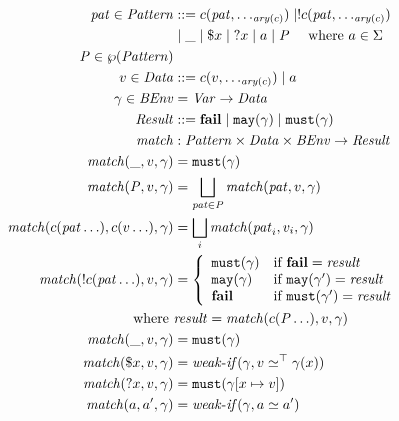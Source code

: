 \documentclass[preprint,onecolumn,9pt]{sigplanconf} %
\begin{document}
\begin{figure}
  \begin{align*}
    \mpat \in \Pattern &::= \mconstructor(\mpat, \ldots_{\ary(\mconstructor)}) \alt \snonevent{\mconstructor(\mpat, \ldots_{\ary(\mconstructor)})} \\
     & \alt \swc \alt \sref{\mvar} \alt \sbind{\mvar} \alt \matom \alt \mpatset
      \quad\text{ where } \matom \in \Sigma
\\
    \mpatset \in \wp(\Pattern)
\\
    \mdata \in \Qualified &::= \mconstructor(\mdata, \ldots_{\ary(\mconstructor)}) \alt \matom
\\
    \mbindenv \in \BindEnv &= \Var \to \Qualified
\\
    \MatchResult &::= \mfail \alt \smay{\mbindenv} \alt \smust{\mbindenv}
\\
    \match &: \Pattern \times \Qualified \times \BindEnv \to \MatchResult
\\
    \match(\swc, \mdata, \mbindenv) &= \smust{\mbindenv}
\\
    \match(\mpatset, \mdata, \mbindenv) &= \bigsqcup\limits_{\mpat \in \mpatset}{\match(\mpat, \mdata, \mbindenv)}
\\
    \match(\mconstructor(\mpat \ldots), \mconstructor(\mdata \ldots), \mbindenv) &=
      \bigsqcup\limits_i{\match(\mpat_i, \mdata_i, \mbindenv)}
\\
    \match(\snonevent{\mconstructor(\mpat \ldots)}, \mdata, \mbindenv) &=
      \left\{\begin{array}{ll}
               \smust{\mbindenv} & \text{if } \mfail = \mres \\
               \smay{\mbindenv} & \text{if } \smay{\mbindenv'} = \mres \\
               \mfail & \text{if } \smust{\mbindenv'} = \mres \\
             \end{array}\right.
    \\ \text{where }& \mres = \match(\mconstructor(\mpatset \ldots), \mdata, \mbindenv)
\\
    \match(\swc, \mdata, \mbindenv) &= \smust{\mbindenv}
\\
    \match(\sref{\mvar}, \mdata, \mbindenv) &= \weakif(\mbindenv, \mdata \simeq^\top \mbindenv(\mvar))
\\
    \match(\sbind{\mvar}, \mdata, \mbindenv) &= \smust{\mbindenv[\mvar \mapsto \mdata]}
\\
    \match(\matom, \matom', \mbindenv) &= \weakif(\mbindenv, \matom \simeq \matom')

\end{align*}
\end{figure}
\end{document}
